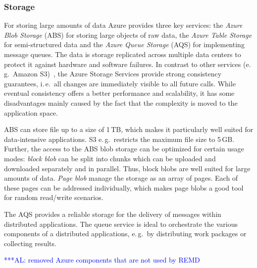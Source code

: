 \documentclass[conference,final]{IEEEtran}
\newcommand{\alnote}[1]{ {\textcolor{blue} { ***AL: #1 }}}
\newcommand{\alnote}[1]{}
\begin{document}
\subsubsection{Storage}

For storing large amounts of data Azure provides
three key services: the \emph{Azure Blob Storage} (ABS) for storing large
objects of raw data, the \emph{Azure Table Storage} for
semi-structured data and the \emph{Azure Queue Storage} (AQS) for
implementing message queues.  The data is storage replicated across
multiple data centers to protect it against hardware and software
failures. In contrast to other services (e.\,g.\ Amazon S3)~\cite{1294281}, the
Azure Storage Services provide strong consistency guarantees, i.\,e.\
all changes are immediately visible to all future calls. While
eventual consistency offers a better performance and scalability, 
it has some disadvantages mainly caused by the fact that the 
complexity is moved to the application space.

ABS can store file up to a size of 1\,TB, which makes it
particularly well suited for data-intensive applications. S3
e.\,g.\ restricts the maximum file size to 5\,GB. Further, the
access to the ABS blob storage can be optimized for certain usage modes:
\emph{block blob} can be split into chunks which can be uploaded and
downloaded separately and in parallel.  Thus, block blobs are well
suited for large amounts of data. \emph{Page
  blob} manage the storage as an array of pages. Each of these pages
can be addressed individually, which makes page blobs a good tool for
random read/write scenarios. 


The AQS provides a reliable storage for the delivery
of messages within distributed applications.  The queue service is
ideal to orchestrate the various components of a distributed
applications, e.\,g.\ by distributing work packages or collecting
results. 

\alnote{removed Azure components that are not used by REMD}
\end{document}
